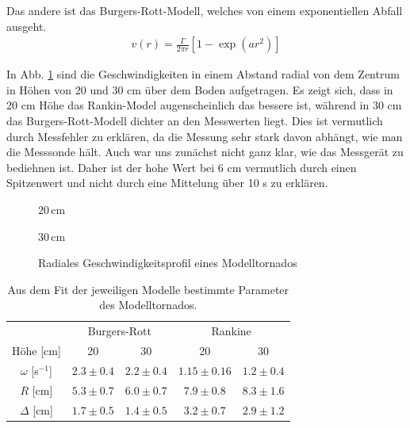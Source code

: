 \documentclass[12pt,a4paper,titlepage,headinclude,bibtotoc]{scrartcl}
\begin{document}
Das andere ist das Burgers-Rott-Modell, welches von einem exponentiellen Abfall ausgeht.
\begin{align}
	v(r) = \frac{\Gamma}{2\pi r}\left[1-\exp\left(a r^2\right)\right]
\end{align}

In Abb. \ref{fig:tornado} sind die Geschwindigkeiten in einem Abstand radial von dem Zentrum in Höhen von 20 und 30 cm über dem Boden aufgetragen.
Es zeigt sich, dass in 20 cm Höhe das Rankin-Model augenscheinlich das bessere ist, während in 30 cm das Burgers-Rott-Modell dichter an den Messwerten liegt.
Dies ist vermutlich durch Messfehler zu erklären, da die Messung sehr stark davon abhängt, wie man die Messsonde hält.
Auch war uns zunächst nicht ganz klar, wie das Messgerät zu bediehnen ist.
Daher ist der hohe Wert bei 6 cm vermutlich durch einen Spitzenwert und nicht durch eine Mittelung über 10 s zu erklären.


 \begin{figure}[!htb]
	\begin{minipage}{0.5\textwidth}	
		\resizebox{\textwidth}{!}{   		
   		}
   		\caption*{$20\,$cm}
   \end{minipage}   
   \begin{minipage}{0.5\textwidth}   		
		\resizebox{\textwidth}{!}{   		
   		}
   		\caption*{$30\,$cm}
   \end{minipage}
   \caption{Radiales Geschwindigkeitsprofil eines Modelltornados\label{fig:tornado}}
 \end{figure}

 \begin{table}[!htb]
 	\centering
 	\begin{tabular}{|c||c|c||c|c|}
 	\hline
			 	& \multicolumn{2}{c||}{Burgers-Rott}	 	& \multicolumn{2}{c|}{Rankine} 		\\
 Höhe [cm]		& 20 		& 30	 	& 20 		& 30 		\\
 	\hline\hline 
 	$\omega$ [s$^{-1}$]	& $2.3 \pm 0.4$ 	& $2.2 \pm 0.4$	 	& $1.15 \pm 0.16$ 	& $1.2 \pm 0.4$ 	\\
 	$R$ [cm]           	& $5.3 \pm 0.7$ 	& $6.0 \pm 0.7 $ 	& $7.9 \pm 0.8$ 	& $8.3 \pm 1.6$ 	\\
 	$\Delta$ [cm]       	& $1.7  \pm 0.5$ 	& $ 1.4 \pm 0.5$ 	& $3.2 \pm 0.7$ 	& $2.9 \pm 1.2$ 	\\
 	\hline
 	\end{tabular}
	\caption{Aus dem Fit der jeweiligen Modelle bestimmte Parameter des Modelltornados.}
 	\label{tab:tornado}
 \end{table}
\end{document}
